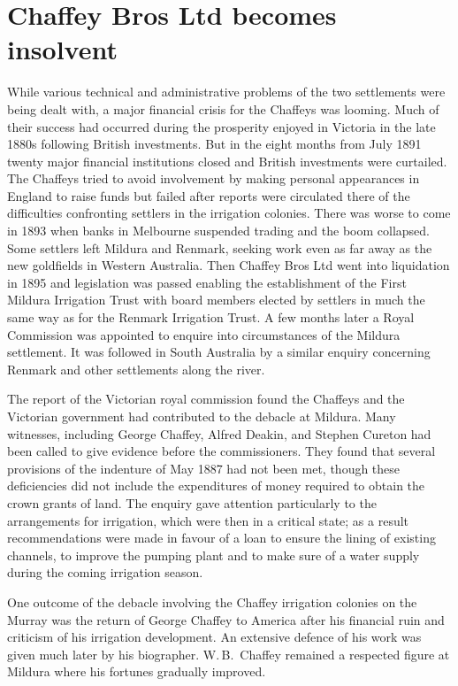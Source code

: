 \section*{Chaffey Bros Ltd becomes insolvent}

While various technical and administrative problems of the two
settlements were being dealt with, a major financial crisis for the
Chaffeys was looming.  Much of their success had occurred during the
prosperity enjoyed in Victoria in the late 1880s following British
investments.  But in the eight months from July 1891 twenty major
financial institutions closed and British investments were curtailed.
The Chaffeys tried to avoid involvement by making personal appearances
in England to raise funds but failed after reports were circulated
there of the difficulties confronting settlers in the irrigation
colonies.  There was worse to come in 1893 when banks in Melbourne
suspended trading and the boom collapsed.  Some settlers left Mildura
and Renmark, seeking work even as far away as the new goldfields in
Western Australia.  Then Chaffey Bros Ltd went into liquidation in
1895 and legislation was passed enabling the establishment of the
First Mildura Irrigation Trust with board members elected by settlers
in much the same way as for the Renmark Irrigation Trust.  A few
months later a Royal Commission was appointed to enquire into
circumstances of the Mildura settlement.  It was followed in South
Australia by a similar enquiry concerning Renmark and other
settlements along the river.

The report of the Victorian royal commission found the Chaffeys and
the Victorian government had contributed to the debacle at Mildura.
Many witnesses, including George Chaffey, Alfred Deakin, and Stephen
Cureton had been called to give evidence before the commissioners.
They found that several provisions of the indenture of May 1887 had
not been met, though these deficiencies did not include the
expenditures of money required to obtain the crown grants of land.
The enquiry gave attention particularly to the arrangements for
irrigation, which were then in a critical state; as a result
recommendations were made in favour of a loan to ensure the lining of
existing channels, to improve the pumping plant and to make sure of a
water supply during the coming irrigation season.

One outcome of the debacle involving the Chaffey irrigation colonies
on the Murray was the return of George Chaffey to America after his
financial ruin and criticism of his irrigation development.  An
extensive defence of his work was given much later by his
biographer. W.\,B.~Chaffey remained a respected figure at Mildura
where his fortunes gradually improved.

